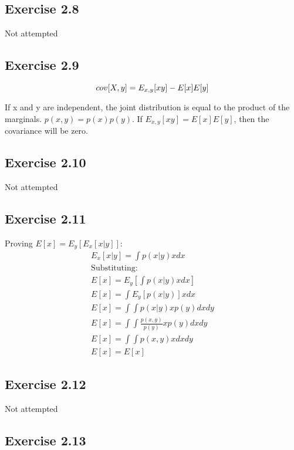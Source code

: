 \subsection{Exercise 2.8}
Not attempted

\subsection{Exercise 2.9}

\begin{equation}
  cov[X,y] = E_{x,y}[xy] - E[x]E[y] \\
\end{equation}

If x and y are independent, the joint distribution is equal to the product of the marginals. $p(x,y) = p(x)p(y)$. If $E_{x,y}[xy] = E[x]E[y]$, then the covariance will be zero.

\subsection{Exercise 2.10}
Not attempted

\subsection{Exercise 2.11}
Proving $E[x] = E_y[E_x[x|y]]$:
\begin{gather}
  E_x[x|y] = \int p(x|y)xdx \\
  \text{Substituting:} \\
  E[x] = E_y[\int p(x|y)xdx] \\
  E[x] = \int E_y[p(x|y)]xdx \\
  E[x] = \int \int p(x|y)xp(y) dxdy \\
  E[x] = \int \int \frac{p(x,y)}{p(y)}xp(y) dxdy \\
  E[x] = \int \int p(x,y)x dxdy \\
  E[x] = E[x]
\end{gather}


\subsection{Exercise 2.12}
Not attempted

\subsection{Exercise 2.13}

